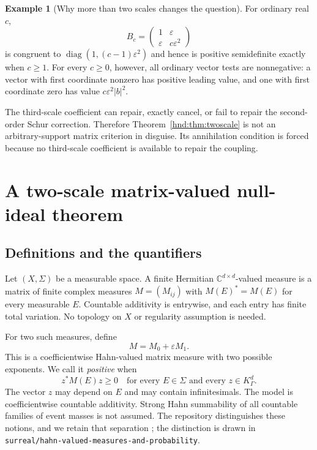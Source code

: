 \documentclass[11pt,oneside]{article}
\theoremstyle{definition}
\newtheorem{example}[theorem]{Example}
\theoremstyle{remark}
\newcommand{\C}{\mathbb C}
\newcommand{\diag}{\operatorname{diag}}
\newcommand{\eps}{\varepsilon}
\newcommand{\repo}[1]{\nolinkurl{#1}}%
\begin{document}
\begin{example}[Why more than two scales changes the question]
\label{hnd:ex:thirdscale}
For ordinary real $c$,
\[
 B_c=\begin{pmatrix}1&\eps\\\eps&c\eps^2\end{pmatrix}
\]
is congruent to $\diag(1,(c-1)\eps^2)$ and hence is positive
semidefinite exactly when $c\ge1$. For every $c\ge0$, however, all
ordinary vector tests are nonnegative: a vector with first coordinate
nonzero has positive leading value, and one with first coordinate zero
has value $c\eps^2|b|^2$.

The third-scale coefficient can repair, exactly cancel, or fail to repair
the second-order Schur correction. Therefore Theorem~\ref{hnd:thm:twoscale}
is not an arbitrary-support matrix criterion in disguise. Its
annihilation condition is forced because no third-scale coefficient is
available to repair the coupling.
\end{example}

\section{A two-scale matrix-valued null-ideal theorem}\label{hnd:sec:measure}

\subsection{Definitions and the quantifiers}

Let $(X,\Sigma)$ be a measurable space. A finite Hermitian
$\C^{d\times d}$-valued measure is a matrix of finite complex measures
$M=(M_{ij})$ with $M(E)^*=M(E)$ for every measurable $E$.
Countable additivity is entrywise, and each entry has finite total
variation. No topology on $X$ or regularity assumption is needed.

For two such measures, define
\[
 M=M_0+\eps M_1.
\]
This is a coefficientwise Hahn-valued matrix measure with two possible
exponents. We call it \emph{positive} when
\begin{equation}\label{hnd:eq:measurepositive}
 z^*M(E)z\ge0
 \quad\text{for every }E\in\Sigma
 \text{ and every }z\in K_\Gamma^d.
\end{equation}
The vector $z$ may depend on $E$ and may contain infinitesimals.
The model is coefficientwise countable additivity. Strong Hahn
summability of all countable families of event masses is not assumed.
The repository distinguishes these notions, and we retain that
separation \cite{repo-herglotz,repo-map}; the distinction is drawn in
\repo{surreal/hahn-valued-measures-and-probability}.
\end{document}
